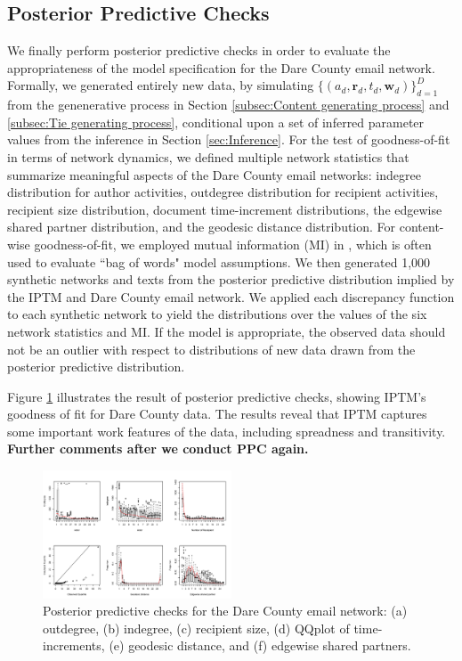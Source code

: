\documentclass[twoside]{article}
\begin{document}
\subsection{Posterior Predictive Checks}
We finally perform posterior predictive checks \cite{rubin1984bayesianly} in order to evaluate the appropriateness of the model specification for the Dare County email network. Formally, we generated entirely new data, by simulating $\{(a_{d}, \boldsymbol{r}_{d}, t_{d}, \boldsymbol{w}_{d})\}_{d=1}^D$ from the genenerative process in Section \ref{subsec:Content generating process} and \ref{subsec:Tie generating process}, conditional upon a set of inferred parameter values from the inference in Section \ref{sec:Inference}. For the test of goodness-of-fit in terms of network dynamics, we defined multiple network statistics that summarize meaningful aspects of the Dare County email networks: indegree distribution for author activities, outdegree distribution for recipient activities, recipient size distribution, document time-increment distributions, the edgewise shared partner distribution, and the geodesic distance distribution. For content-wise goodness-of-fit, we employed mutual information (MI) in \cite{mimno2011bayesian}, which is often used to evaluate ``bag of words" model assumptions. We then generated 1,000 synthetic networks and texts from the posterior predictive distribution implied by the IPTM and Dare County email network.
We applied each discrepancy function to each synthetic network to yield the distributions over the values of the six network statistics and MI. If the model is appropriate, the observed data should not be an outlier with respect to distributions of new data drawn from the posterior predictive distribution. 

Figure \ref{fig:PPC} illustrates the result of posterior predictive checks, showing IPTM's goodness of fit for Dare County data. The results reveal that IPTM captures some important work features of the data, including spreadness and transitivity. \textbf{Further comments after we conduct PPC again.}
	\begin{figure}[h]
		\centering
		\includegraphics[width = 0.5\textwidth]{plots/PPC_plot.pdf}
		\caption{Posterior predictive checks for the Dare County email network: (a) outdegree, (b) indegree, (c) recipient size, (d) QQplot of time-increments, (e) geodesic distance, and (f) edgewise shared partners.}
		\label{fig:PPC}
	\end{figure}
\end{document}
